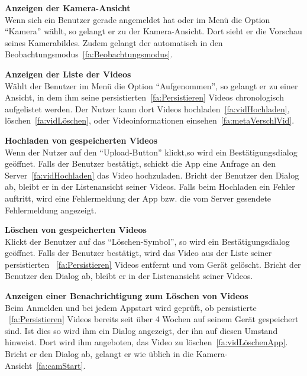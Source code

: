 \begin{enumerate}
\begin{minipage}[t]{\linewidth}
\item \label{fa:kamAnsicht}\textbf{Anzeigen der Kamera-Ansicht} \hfill \\
Wenn sich ein Benutzer gerade angemeldet hat oder im Menü die Option ``Kamera'' wählt, so gelangt er zu der Kamera-Ansicht. Dort sieht er die Vorschau seines Kamerabildes. Zudem gelangt der automatisch in den Beobachtungsmodus~\eqref{fa:Beobachtungsmodus}.

\item \label{fa:vidAnsicht}\textbf{Anzeigen der Liste der  Videos} \hfill \\
Wählt der Benutzer im Menü die Option ``Aufgenommen'', so gelangt er zu einer Ansicht, in dem ihm seine persistierten~\eqref{fa:Persistieren} Videos chronologisch aufgelistet werden. Der Nutzer kann dort Videos hochladen~\eqref{fa:vidHochladen}, löschen~\eqref{fa:vidLöschen}, oder Videoinformationen einsehen~\eqref{fa:metaVerschlVid}.
\end{minipage}

\item \label{fa:vidHochladen}\textbf{Hochladen von gespeicherten Videos} \hfill \\
Wenn der Nutzer auf den ``Upload-Button'' klickt,so wird ein Bestätigungsdialog geöffnet. Falls der Benutzer bestätigt, schickt die \gls{App} eine Anfrage an den Server~\eqref{fa:vidHochladen} das Video hochzuladen. Bricht der Benutzer den Dialog ab, bleibt er in der Listenansicht seiner Videos. Falls beim Hochladen ein Fehler auftritt, wird eine Fehlermeldung der App bzw. die vom Server gesendete Fehlermeldung angezeigt.

\item \label{fa:vidLöschenApp}\textbf{Löschen von gespeicherten Videos} \hfill \\
Klickt der Benutzer auf das ``Löschen-Symbol'', so wird ein Bestätigungsdialog geöffnet. Falls der Benutzer bestätigt, wird das Video aus der Liste seiner persistierten ~\eqref{fa:Persistieren} Videos entfernt und vom Gerät gelöscht. Bricht der Benutzer den Dialog ab, bleibt er in der Listenansicht seiner Videos.

\item \label{fa:vidLöschenDialog}\textbf{Anzeigen einer Benachrichtigung zum Löschen von Videos} \hfill \\
Beim Anmelden und bei jedem Appstart wird geprüft, ob persistierte ~\eqref{fa:Persistieren} Videos bereits seit über 4 Wochen auf seinem Gerät gespeichert sind. Ist dies so wird ihm ein Dialog angezeigt, der ihn auf diesen Umstand hinweist. Dort wird ihm angeboten, das Video zu löschen~\eqref{fa:vidLöschenApp}. Bricht er den Dialog ab, gelangt er wie üblich in die Kamera-Ansicht~\eqref{fa:camStart}.


\end{enumerate}
